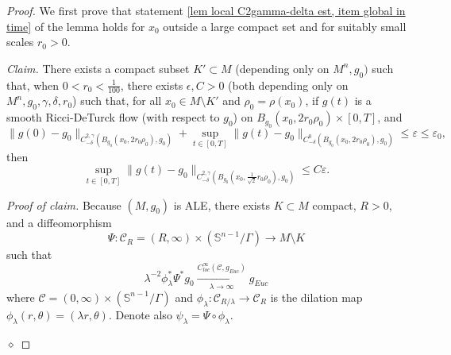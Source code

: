 \documentclass[12pt]{amsart}
\renewcommand{\1}{{\mathbf 1}}
\newcommand{\eps}{{\varepsilon}}
\newenvironment{claim}{\par\medskip\noindent\textit{Claim.}\space}{\par\medskip}
\newenvironment{claimproof}{\par\noindent\textit{Proof of claim.}\space}{\hfill$\diamond$\medskip\par}
\theoremstyle{others}
\numberwithin{equation}{section}
\begin{document}
\begin{proof}
    We first prove that statement \eqref{lem local C2gamma-delta est, item global in time} of the lemma holds for $x_0$ outside a large compact set and for suitably small scales $r_0 > 0$.

    \begin{claim} \label{proof local higher order est, claim 1}
        There exists a compact subset $K' \subset M$ (depending only on $M^n, g_0)$ such that, when $0 < r_0 < \frac1{100}$, there exists $\epsilon, C > 0$ (both depending only on $M^n, g_0, \gamma, \delta, r_0 $) such that, 
        for all $x_0 \in M \setminus K'$ and $\rho_0 = \rho(x_0)$, if
        $g(t)$ is a smooth Ricci-DeTurck flow (with respect to $g_0$) on $B_{g_0}(x_0, 2 r_0 \rho_0) \times [0, T]$, and 
            $$\| g(0) - g_0 \|_{C^{2, \gamma}_{-\delta}(B_{g_0}(x_0, 2 r_0 \rho_0), g_0) } + \sup_{t \in [0, T]} \| g(t) - g_0 \|_{C^0_{-\delta}(B_{g_0}(x_0, 2 r_0 \rho_0), g_0)} \le \eps \leq \eps_0 ,$$
        then
            $$\sup_{t \in [0,T]} \| g(t) - g_0 \|_{C^{2, \gamma}_{-\delta} \left(B_{g_0}\left(x_0, \frac1{\sqrt 2}  r_0 \rho_0 \right), g_0 \right)}
        \le C \eps.$$ %
    \end{claim}
    \begin{claimproof}
        Because $(M, g_0)$ is ALE, there exists $K \subset M$ compact, $R > 0$, and a diffeomorphism
            $$\Psi :  \mathcal C_R = (R, \infty) \times (\mathbb{S}^{n-1}/ \Gamma) \to M \setminus K $$
        such that
        \begin{equation} \label{proof local higher order est, eqn 2}
            \lambda^{-2} \phi_{\lambda}^* \Psi^* g_0 \xrightarrow[\lambda \to \infty]{C^\infty_{loc}(\mathcal C, g_{Euc})} g_{Euc}
        \end{equation}
        where $\mathcal C  = (0, \infty) \times ( \mathbb S^{n-1} / \Gamma)$ and $\phi_\lambda : \mathcal C_{R / \lambda} \to \mathcal C_R$ is the dilation map $\phi_\lambda (r, \theta) = (\lambda r, \theta)$.
        Denote also $\psi_\lambda = \Psi \circ \phi_\lambda$.
    

\end{claimproof}
\end{proof}
\end{document}
